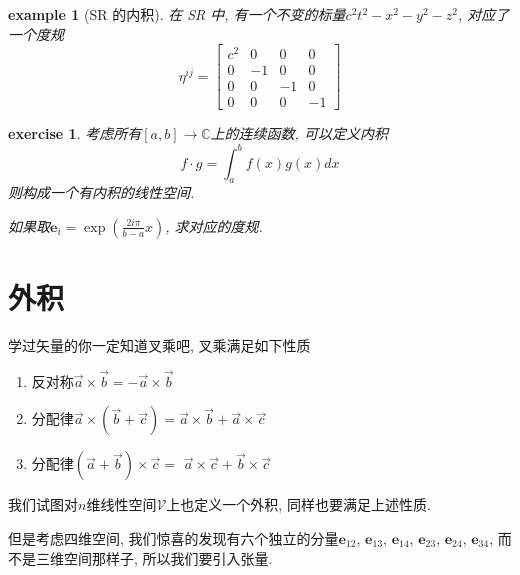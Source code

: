 \documentclass[12pt]{ctexbook}
\numberwithin{definition}{section}
\numberwithin{theorem}{section}
\newtheorem{exercise}{exercise}
\numberwithin{exercise}{section}
\newtheorem{example}{example}
\numberwithin{example}{section}
\numberwithin{lemma}{section}
\begin{document}
    \begin{example}
        [SR 的内积] 在 SR 中, 有一个不变的标量\(c^2t^2 - x^2 - y^2 - z^2\), 对应了一个度规
        \begin{equation}
            \eta^{ij} = \begin{bmatrix}
                c^2 & 0 & 0 & 0 \\
                0 & -1 & 0 & 0 \\
                0 & 0 & -1 & 0 \\
                0 & 0 & 0 & -1
            \end{bmatrix}
        \end{equation}
    \end{example}

    \begin{exercise}
        考虑所有\([a,b] \to \mathbb{C}\)上的连续函数, 可以定义内积
        \begin{equation}
            f \cdot g = \int_{a}^{b}f(x)g(x)dx
        \end{equation}
        则构成一个有内积的线性空间.

        如果取\(\boldsymbol{e}_i = \exp {(\frac{2i\pi}{b-a}x)}\), 求对应的度规.
    \end{exercise}

    \section{外积}

    学过矢量的你一定知道叉乘吧, 叉乘满足如下性质

    \begin{enumerate}
        \item 反对称\(\vec{a} \times \vec{b} = - \vec{a} \times \vec{b}\)
        \item 分配律\(\vec{a} \times (\vec{b} + \vec{c}) = \vec{a} \times \vec{b} + \vec{a} \times \vec{c}\)
        \item 分配律\((\vec{a} + \vec{b}) \times \vec{c} = \) \(\vec{a} \times \vec{c} + \vec{b} \times \vec{c}\)
    \end{enumerate}

    我们试图对\(n\)维线性空间\(\mathcal{V}\)上也定义一个外积, 同样也要满足上述性质.

    但是考虑四维空间, 我们惊喜的发现有六个独立的分量\(\boldsymbol{e}_{12}\), \(\boldsymbol{e}_{13}\), 
    \(\boldsymbol{e}_{14}\), \(\boldsymbol{e}_{23}\), \(\boldsymbol{e}_{24}\), \(\boldsymbol{e}_{34}\),
    而不是三维空间那样子, 所以我们要引入张量.
\end{document}
